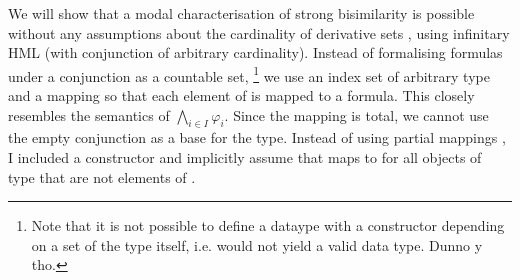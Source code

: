 %
\begin{isabellebody}%
%
%
\isadelimtheory
%
\endisadelimtheory
%
\isatagtheory
%
\endisatagtheory
{\isafoldtheory}%
%
\isadelimtheory
%
\endisadelimtheory
%
\isadelimdocument
%
\endisadelimdocument
%
\isatagdocument
%
\isamarkuptrue%
%
\endisatagdocument
{\isafolddocument}%
%
\isadelimdocument
%
\endisadelimdocument
%
\begin{isamarkuptext}%
\label{chap:HML_infinitary}%
\end{isamarkuptext}\isamarkuptrue%
%
\begin{isamarkuptext}%
We will show that a modal characterisation of strong bisimilarity is possible without any assumptions about the cardinality of derivative sets , using infinitary HML (with conjunction of arbitrary cardinality). Instead of formalising formulas under a conjunction as a countable set,%
\footnote{Note that it is not possible to define a dataype with a constructor depending on a set of the type itself, i.e.\@ {} would not yield a valid data type. Dunno y tho.}
we use an index set of arbitrary type  and a mapping  so that each element of  is mapped to a formula. This closely resembles the semantics of $\bigwedge_{i \in I} \varphi_i$. Since the mapping is total, we cannot use the empty conjunction as a base for the type. Instead of using partial mappings , I included a constructor  and implicitly assume that  maps to  for all objects of type  that are not elements of .%

\end{isamarkuptext}
\end{isabellebody}
